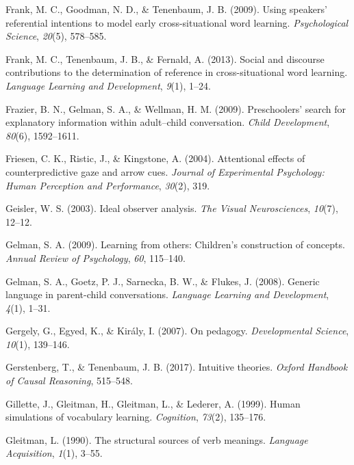 \documentclass[oneside]{report}
\begin{document}
\hypertarget{ref-frank2009using}{}
Frank, M. C., Goodman, N. D., \& Tenenbaum, J. B. (2009). Using
speakers' referential intentions to model early cross-situational word
learning. \emph{Psychological Science}, \emph{20}(5), 578--585.

\hypertarget{ref-frank2013social}{}
Frank, M. C., Tenenbaum, J. B., \& Fernald, A. (2013). Social and
discourse contributions to the determination of reference in
cross-situational word learning. \emph{Language Learning and
Development}, \emph{9}(1), 1--24.

\hypertarget{ref-frazier2009preschoolers}{}
Frazier, B. N., Gelman, S. A., \& Wellman, H. M. (2009). Preschoolers'
search for explanatory information within adult--child conversation.
\emph{Child Development}, \emph{80}(6), 1592--1611.

\hypertarget{ref-friesen2004attentional}{}
Friesen, C. K., Ristic, J., \& Kingstone, A. (2004). Attentional effects
of counterpredictive gaze and arrow cues. \emph{Journal of Experimental
Psychology: Human Perception and Performance}, \emph{30}(2), 319.

\hypertarget{ref-geisler2003ideal}{}
Geisler, W. S. (2003). Ideal observer analysis. \emph{The Visual
Neurosciences}, \emph{10}(7), 12--12.

\hypertarget{ref-gelman2009learning}{}
Gelman, S. A. (2009). Learning from others: Children's construction of
concepts. \emph{Annual Review of Psychology}, \emph{60}, 115--140.

\hypertarget{ref-gelman2008generic}{}
Gelman, S. A., Goetz, P. J., Sarnecka, B. W., \& Flukes, J. (2008).
Generic language in parent-child conversations. \emph{Language Learning
and Development}, \emph{4}(1), 1--31.

\hypertarget{ref-gergely2007pedagogy}{}
Gergely, G., Egyed, K., \& Király, I. (2007). On pedagogy.
\emph{Developmental Science}, \emph{10}(1), 139--146.

\hypertarget{ref-gerstenberg2017intuitive}{}
Gerstenberg, T., \& Tenenbaum, J. B. (2017). Intuitive theories.
\emph{Oxford Handbook of Causal Reasoning}, 515--548.

\hypertarget{ref-gillette1999human}{}
Gillette, J., Gleitman, H., Gleitman, L., \& Lederer, A. (1999). Human
simulations of vocabulary learning. \emph{Cognition}, \emph{73}(2),
135--176.

\hypertarget{ref-gleitman1990structural}{}
Gleitman, L. (1990). The structural sources of verb meanings.
\emph{Language Acquisition}, \emph{1}(1), 3--55.
\end{document}
